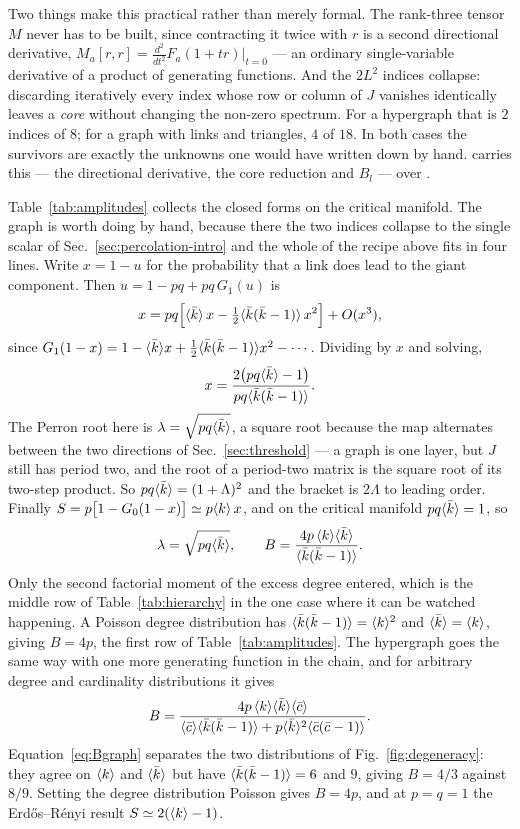 Two things make this practical rather than merely formal. The rank-three tensor
$M$ never has to be built, since contracting it twice with $r$ is a second
directional derivative, $M_{a}[r,r]=\frac{d^{2}}{dt^{2}}F_{a}(1+tr)|_{t=0}$ ---
an ordinary single-variable derivative of a product of generating functions. And
the $2L^{2}$ indices collapse: discarding iteratively every index whose row or
column of $J$ vanishes identically leaves a \emph{core} without changing the
non-zero spectrum. For a hypergraph that is $2$ indices of $8$; for a graph with
links and triangles, $4$ of $18$. In both cases the survivors are exactly the
unknowns one would have written down by hand.  carries this --- the directional
derivative, the core reduction and $B_{l}$ --- over
.

Table~\ref{tab:amplitudes} collects the closed forms on the critical manifold.
The graph is worth doing by hand, because there the two indices collapse to the
single scalar of Sec.~\ref{sec:percolation-intro} and the whole of the recipe
above fits in four lines. Write $x=1-u$ for the probability that a link does
lead to the giant component. Then $u=1-pq+pq\,G_{1}(u)$ is
\[
  x=pq\Bigl[\langle \bar k \rangle\,x-\tfrac12\langle \bar k(\bar k-1) \rangle\,x^{2}\Bigr]
    +O(x^{3}),
\]
since $G_{1}(1-x)=1-\langle \bar k \rangle x+\tfrac12\langle \bar k(\bar k-1) \rangle x^{2}-\cdots$.
Dividing by $x$ and solving,
\[
  x=\frac{2\bigl(pq\langle \bar k \rangle-1\bigr)}{pq\langle \bar k(\bar k-1) \rangle}.
\]
The Perron root here is $\lambda=\sqrt{pq\langle \bar k \rangle}$, a square root because
the map alternates between the two directions of Sec.~\ref{sec:threshold} --- a
graph is one layer, but $J$ still has period two, and the root of a period-two
matrix is the square root of its two-step product. So
$pq\langle \bar k \rangle=(1+\Lambda)^{2}$ and the bracket is $2\Lambda$ to leading
order. Finally $S=p\bigl[1-G_{0}(1-x)\bigr]\simeq p\langle k \rangle\,x$, and on the
critical manifold $pq\langle \bar k \rangle=1$, so
\begin{equation}
  \lambda=\sqrt{pq\langle \bar k \rangle},
  \qquad
  B=\frac{4p\,\langle k \rangle\langle \bar k \rangle}{\langle \bar k(\bar k-1) \rangle}.
  \label{eq:Bgraph}
\end{equation}
Only the second factorial moment of the excess degree entered, which is the
middle row of Table~\ref{tab:hierarchy} in the one case where it can be watched
happening. A Poisson degree distribution has
$\langle \bar k(\bar k-1) \rangle=\langle k \rangle^{2}$ and $\langle \bar k \rangle=\langle k \rangle$, giving $B=4p$,
the first row of Table~\ref{tab:amplitudes}.
The hypergraph goes the same way with one more generating function in the
chain, and for arbitrary degree and cardinality distributions it gives
\begin{equation}
  B=\frac{4p\,\langle k \rangle\langle \bar k \rangle\langle \bar c \rangle}
         {\langle \bar c \rangle\langle \bar k(\bar k-1) \rangle
          +p\langle \bar k \rangle^{2}\langle \bar c(\bar c-1) \rangle}.
  \label{eq:Bhyper}
\end{equation}
Equation~\eqref{eq:Bgraph} separates the two distributions of
Fig.~\ref{fig:degeneracy}: they agree on $\langle k \rangle$ and $\langle \bar k \rangle$ but have
$\langle \bar k(\bar k-1) \rangle=6$ and $9$, giving $B=4/3$ against $8/9$. Setting the
degree distribution Poisson gives $B=4p$, and at $p=q=1$ the
Erd\H{o}s--R\'enyi result $S\simeq2(\langle k \rangle-1)$.

